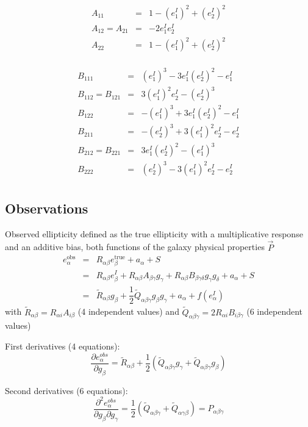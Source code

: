 \documentclass[a4paper]{article}
\begin{document}
$$
\begin{array}{rcl}
A_{11} &=&  1-(e_1^I)^2+(e_2^I)^2 \\
A_{12}=A_{21} &=&  -2e_1^I e_2^I \\
A_{22} &=&  1-(e_1^I)^2+(e_2^I)^2 \\
\end{array}
$$

$$
\begin{array}{rcl}
B_{111} &=&   (e_1^I)^3 -3e_1^I(e_2^I)^2 -e_1^I \\
B_{112}=B_{121} &=& 3(e_1^I)^2e_2^I -(e_2^I)^3 \\
B_{122} &=&  -(e_1^I)^3 +3e_1^I(e_2^I)^2 -e_1^I \\
B_{211} &=&  -(e_2^I)^3 +3(e_1^I)^2e_2^I -e_2^I \\
B_{212}=B_{221} &=& 3e_1^I(e_2^I)^2 -(e_1^I)^3 \\
B_{222} &=&   (e_2^I)^3 -3(e_1^I)^2e_2^I -e_2^I \\
\end{array}
$$

\subsection{Observations}

Observed ellipticity defined as the true ellipticity with a multiplicative response and an additive bias, both functions of the galaxy physical properties $\vec{P}$
$$
\begin{array}{lcl}
e_\alpha^\text{obs} &=& R_{\alpha\beta}e_\beta^\text{true} + a_\alpha + S \\
&=& R_{\alpha\beta}e_\beta^I + R_{\alpha\beta}A_{\beta\gamma}g_\gamma + R_{\alpha\beta}B_{\beta\gamma\delta}g_\gamma g_\delta + a_\alpha + S \\
&=& \tilde{R}_{\alpha\beta}g_\beta + \dfrac{1}{2}\tilde{Q}_{\alpha\beta\gamma}g_\beta g_\gamma + a_\alpha + f(e_\alpha^I)
\end{array}
$$
with $\tilde{R}_{\alpha\beta} = R_{\alpha i}A_{i \beta}$ (4 independent values) and $\tilde{Q}_{\alpha\beta\gamma} = 2R_{\alpha i}B_{i \beta\gamma}$ (6 independent values)

First derivatives (4 equations):
$$
\dfrac{\partial e_\alpha^{obs}}{\partial g_\beta} = \tilde{R}_{\alpha\beta} + \dfrac{1}{2}\left( \tilde{Q}_{\alpha\beta\gamma}g_\gamma + \tilde{Q}_{\alpha\beta\gamma}g_\beta \right)
$$

Second derivatives (6 equations):
$$
\dfrac{\partial^2 e_\alpha^{obs}}{\partial g_\beta\partial g_\gamma} = \dfrac{1}{2}\left( \tilde{Q}_{\alpha\beta\gamma} + \tilde{Q}_{\alpha\gamma\beta} \right) = P_{\alpha\beta\gamma}
$$
\end{document}
